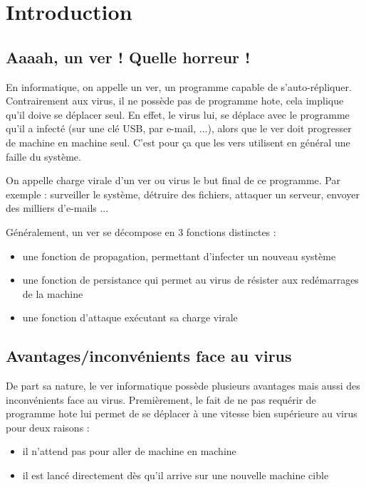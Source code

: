 \documentclass[]{projet-M1}
\begin{document}
\renewcommand{\labelitemi}{$\vcenter{\hbox{\tiny$\bullet$}}$}
\makemytitle{}
\tableofcontents
\newpage
\section{Introduction}
\subsection{Aaaah, un ver ! Quelle horreur !}
En informatique, on appelle un ver, un programme capable de s'auto-répliquer. Contrairement aux virus, il ne possède pas de \gls{programme hote}, cela implique qu'il doive se déplacer seul. En effet, le virus lui, se déplace avec le programme qu'il a infecté (sur une clé USB, par e-mail, ...), alors que le ver doit progresser de machine en machine seul. C'est pour ça que les vers utilisent en général une \gls{faille} du système. 

On appelle \gls{charge virale} d'un ver ou virus le but final de ce programme. Par exemple : surveiller le système, détruire des fichiers, attaquer un serveur, envoyer des milliers d'e-mails ...

Généralement, un ver se décompose en 3 fonctions distinctes : 
\begin{itemize}
\item une fonction de propagation, permettant d'infecter un nouveau système
\item une fonction de persistance qui permet au virus de résister aux redémarrages de la machine
\item une fonction d'attaque exécutant sa \gls{charge virale}
\end{itemize}

\subsection{Avantages/inconvénients face au virus}
De part sa nature, le ver informatique possède plusieurs avantages mais aussi des inconvénients face au virus. 
Premièrement, le fait de ne pas requérir de \gls{programme hote} lui permet de se déplacer à une vitesse bien supérieure au virus pour deux raisons : 
\begin{itemize}
\item il n'attend pas pour aller de machine en machine
\item il est lancé directement dès qu'il arrive sur une nouvelle machine cible
\end{itemize}
\end{document}

